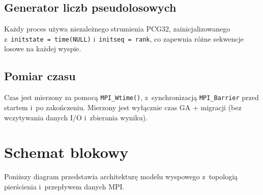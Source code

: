 \documentclass[12pt,a4paper]{article}
\begin{document}
\subsection{Generator liczb pseudolosowych}

Ka\.{z}dy proces u\.{z}ywa niezale\.{z}nego strumienia PCG32, zainicjalizowanego z~\texttt{initstate = time(NULL)} i~\texttt{initseq = rank}, co zapewnia r\'{o}\.{z}ne sekwencje losowe na ka\.{z}dej wyspie.

\subsection{Pomiar czasu}

Czas jest mierzony za pomoc\k{a} \texttt{MPI\_Wtime()}, z~synchronizacj\k{a} \texttt{MPI\_Barrier} przed startem i~po zako\'{n}czeniu. Mierzony jest wy\l{}\k{a}cznie czas GA + migracji (bez wczytywania danych I/O i~zbierania wyniku).

\section{Schemat blokowy}

Poni\.{z}szy diagram przedstawia architektur\k{e} modelu wyspowego z~topologi\k{a} pier\'{s}cienia i~przep\l{}ywem danych MPI.
\end{document}
